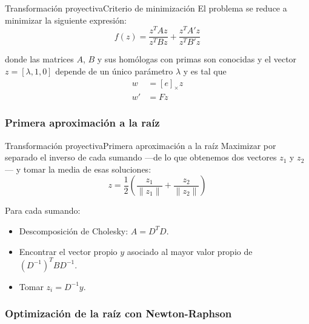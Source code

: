 \documentclass[aspectratio=169,14pt,spanish]{beamer}
\begin{document}
      \begin{frame}{Transformación proyectiva}{Criterio de minimización}
          El problema se reduce a minimizar la siguiente expresión:
          \begin{equation}
              f(z) = \frac{z^T Az}{z^T Bz} + \frac{z^T A'z}{z^T B'z}
              \label{eq_minz}
          \end{equation}

          donde las matrices $A$, $B$ y sus homólogas con primas son conocidas y el vector $z = [\lambda, 1, 0]$ depende de un único parámetro $\lambda$ y es tal que
          \begin{align*}
            w &= [e]_\times z\\
            w' &= Fz
          \end{align*}
      \end{frame}

      \subsubsection{Primera aproximación a la raíz}

        \begin{frame}{Transformación proyectiva}{Primera aproximación a la raíz}
            Maximizar por separado el inverso de cada sumando ---de lo que obtenemos dos vectores $z_1$ y $z_2$--- y tomar la media de esas soluciones:
            \[
            z = \frac{1}{2}\left(\frac{z_1}{\lVert z_1 \rVert} + \frac{z_2}{\lVert z_2 \rVert}\right)
            \]

            Para cada sumando:
            \begin{itemize}
                \item<2-> Descomposición de Cholesky: $A = D^T D$.
                \item<3-> Encontrar el vector propio $y$ asociado al mayor valor propio de $(D^{-1})^T B D^{-1}$.
                \item<4-> Tomar $z_i = D^{-1}y$.
            \end{itemize}
        \end{frame}
      \subsubsection{Optimización de la raíz con Newton-Raphson}
\end{document}

